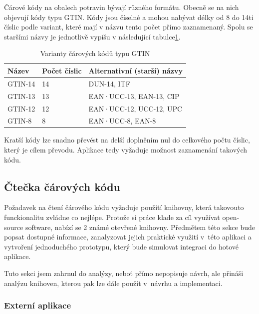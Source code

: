 \documentclass[thesis=B,czech]{FITthesis}[2013/10/20]
\begin{document}
Čárové kódy na obalech potravin bývají různého formátu. Obecně se na nich objevují kódy typu GTIN. Kódy jsou číselné a mohou nabývat délky od 8 do 14ti číslic podle variant, které mají v názvu tento počet přímo zaznamenaný. Spolu se staršími názvy je jednotlivě vypíšu v následující tabulce\ref{table:carkod}.
\begin{table}[h]
      \begin{tabular}{|l|l|l|}
      \hline
      Název   & Počet číslic & Alternativní (starší) názvy \\ \hline
      GTIN-14 & 14           & DUN-14, ITF                 \\ \hline
      GTIN-13 & 13           & EAN·UCC-13, EAN-13, CIP     \\ \hline
      GTIN-12 & 12           & EAN·UCC-12, UCC-12, UPC     \\ \hline
      GTIN-8  & 8            & EAN·UCC-8, EAN-8            \\ \hline
      \end{tabular}
      \caption{Varianty čárových kódů typu GTIN}
      \label{table:carkod}
\end{table}
Kratší kódy lze snadno převést na delší doplněním nul do celkového počtu číslic, který je cílem převodu. Aplikace tedy vyžaduje možnost zaznamenání takových kódu.

\subsection{Čtečka čárových kódu}

Požadavek na čtení čárového kódu vyžaduje použití knihovny, která takovouto funckionalitu zvládne co nejlépe. Protože si práce klade za cíl využívat open-source software, nabízí se 2 známé otevřené knihovny. Předmětem této sekce bude popsat dostupné informace, zanalyzovat jejich praktické využití v~této aplikaci a vytvoření jednoduchého prototypu, který bude simulovat integraci do hotové aplikace.

Tuto sekci jsem zahrnul do analýzy, neboť přímo nepopisuje návrh, ale přináši analýzu knihoven, kterou pak lze dále použít v~návrhu a implementaci.

\subsubsection{Externí aplikace}
\end{document}
